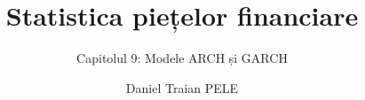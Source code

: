\title[Statistica piețelor financiare]{Statistica piețelor financiare}
\subtitle{Capitolul 9: Modele ARCH și GARCH}
\author[D.T. Pele]{Daniel Traian PELE}
\date{}

\providecommand{\sfmapplink}[3]{\hypertarget{#2}{}\hyperlink{#1}{\beamergotobutton{#3}}}  %
\providecommand{\sfmappback}[2]{\begin{tikzpicture}[remember picture,overlay]\node[anchor=south east] at ([xshift=-3mm,yshift=7mm]current page.south east){\hyperlink{#1}{\beamerreturnbutton{#2}}};\end{tikzpicture}}  %
\providecommand{\sfmchlink}[2]{\href{#1}{#2}}  %
\providecommand{\sfmchlinkt}[2]{\href{#1}{\usebeamercolor[fg]{frametitle}#2}}  %


